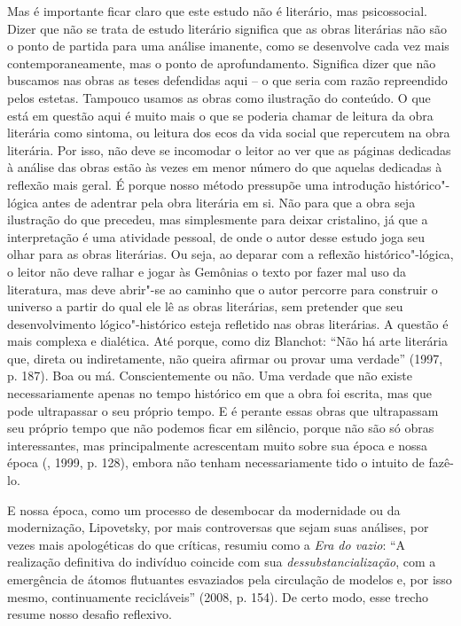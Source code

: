 Mas é importante ficar claro que este estudo não é literário, mas
psicossocial. Dizer que não se trata de estudo literário significa que
as obras literárias não são o ponto de partida para uma análise
imanente, como se desenvolve cada vez mais contemporaneamente, mas o
ponto de aprofundamento. Significa dizer que não buscamos nas obras as
teses defendidas aqui -- o que seria com razão repreendido pelos
estetas. Tampouco usamos as obras como ilustração do conteúdo. O que
está em questão aqui é muito mais o que se poderia chamar de leitura da
obra literária como sintoma, ou leitura dos ecos da vida social que
repercutem na obra literária. Por isso, não deve se incomodar o leitor
ao ver que as páginas dedicadas à análise das obras estão às vezes em
menor número do que aquelas dedicadas à reflexão mais geral. É porque
nosso método pressupõe uma introdução histórico"-lógica antes de adentrar
pela obra literária em si. Não para que a obra seja ilustração do que
precedeu, mas simplesmente para deixar cristalino, já que a
interpretação é uma atividade pessoal, de onde o autor desse estudo joga
seu olhar para as obras literárias. Ou seja, ao deparar com a reflexão
histórico"-lógica, o leitor não deve ralhar e jogar às Gemônias o texto
por fazer mal uso da literatura, mas deve abrir"-se ao caminho que o
autor percorre para construir o universo a partir do qual ele lê as
obras literárias, sem pretender que seu desenvolvimento lógico"-histórico
esteja refletido nas obras literárias. A questão é mais complexa e
dialética. Até porque, como diz Blanchot: ``Não há arte literária que,
direta ou indiretamente, não queira afirmar ou provar uma verdade''
(1997, p. 187). Boa ou má. Conscientemente ou não. Uma verdade que não
existe necessariamente apenas no tempo histórico em que a obra foi
escrita, mas que pode ultrapassar o seu próprio tempo. E é perante essas
obras que ultrapassam seu próprio tempo que não podemos ficar em
silêncio, porque não são só obras interessantes, mas principalmente
acrescentam muito sobre sua época e nossa época (, 1999, p. 128),
embora não tenham necessariamente tido o intuito de fazê-lo.

E nossa época, como um processo de desembocar da modernidade ou da
modernização, Lipovetsky, por mais controversas que sejam suas análises,
por vezes mais apologéticas do que críticas, resumiu como a \emph{Era do
vazio}: ``A realização definitiva do indivíduo coincide com sua
\emph{dessubstancialização}, com a emergência de átomos flutuantes
esvaziados pela circulação de modelos e, por isso mesmo, continuamente
recicláveis'' (2008, p. 154). De certo modo, esse trecho resume nosso
desafio reflexivo.

